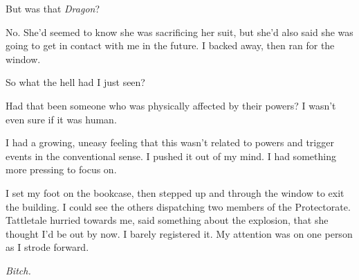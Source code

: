 But was that \emph{Dragon}?



No.  She'd seemed to know she was sacrificing her suit, but she'd also said she was going to get in contact with me in the future.  I backed away, then ran for the window.



So what the hell had I just seen?



Had that been someone who was physically affected by their powers?  I wasn't even sure if it was human.



I had a growing, uneasy feeling that this wasn't related to powers and trigger events in the conventional sense.  I pushed it out of my mind.  I had something more pressing to focus on.



I set my foot on the bookcase, then stepped up and through the window to exit the building.  I could see the others dispatching two members of the Protectorate.  Tattletale hurried towards me, said something about the explosion, that she thought I'd be out by now.  I barely registered it.  My attention was on one person as I strode forward.



\emph{Bitch.}


